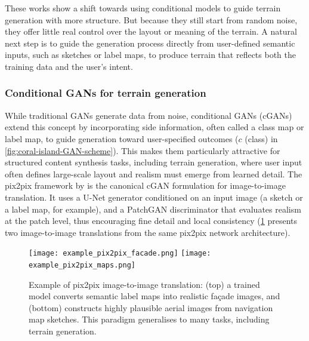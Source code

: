 These works show a shift towards using conditional models to guide terrain generation with more structure. But because they still start from random noise, they offer little real control over the layout or meaning of the terrain. A natural next step is to guide the generation process directly from user-defined semantic inputs, such as sketches or label maps, to produce terrain that reflects both the training data and the user's intent.


\subsubsection{Conditional GANs for terrain generation}
\label{sec:coral-island-sota-cGAN}

While traditional GANs generate data from noise, conditional GANs (cGANs) extend this concept by incorporating side information, often called a class map or label map, to guide generation toward user-specified outcomes \cite{Mirza2014} ($c$ (class) in \cref{fig:coral-island-GAN-scheme}). This makes them particularly attractive for structured content synthesis tasks, including terrain generation, where user input often defines large-scale layout and realism must emerge from learned detail. The pix2pix framework by \cite{Isola2017} is the canonical cGAN formulation for image-to-image translation. It uses a U-Net generator conditioned on an input image (a sketch or a label map, for example), and a PatchGAN discriminator that evaluates realism at the patch level, thus encouraging fine detail and local consistency (\cref{fig:coral-island-pix2pix-example} presents two image-to-image translations from the same pix2pix network architecture).

\begin{figure}
    \texttt{[image: example\_pix2pix\_facade.png]}
    \texttt{[image: example\_pix2pix\_maps.png]}
    \caption[Examples of pix2pix use cases]{Example of pix2pix image-to-image translation: (top) a trained model converts semantic label maps into realistic façade images, and (bottom) constructs highly plausible aerial images from navigation map sketches. This paradigm generalises to many tasks, including terrain generation.}
    \label{fig:coral-island-pix2pix-example}
\end{figure}

